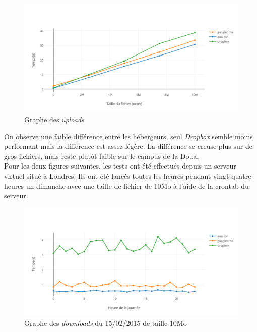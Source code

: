 \documentclass[10pt]{article}
\begin{document}
\begin{figure}[h] \centering
\includegraphics[scale=0.65]{graphe_des_uploads.png} \caption{Graphe des
\textit{uploads}} \end{figure}

On observe une faible différence entre les hébergeurs, seul \textit{Dropbox} semble moins performant mais la différence est assez légère. La différence se creuse plus sur de gros fichiers, mais reste plutôt faible sur le campus de la Doua.\\

Pour les deux figures suivantes, les tests ont été effectués depuis un serveur
virtuel situé à Londres. Ils ont été lancés toutes les heures pendant vingt
quatre heures un dimanche avec une taille de fichier de 10Mo à l'aide de la
crontab du serveur.

\begin{figure}[h] \centering
\includegraphics[scale=0.7]{graphe_du_15022015_pour_les_download_de_taille_10mo.png}
\caption{Graphe des \textit{downloads} du 15/02/2015 de taille 10Mo} \end{figure}
\end{document}
